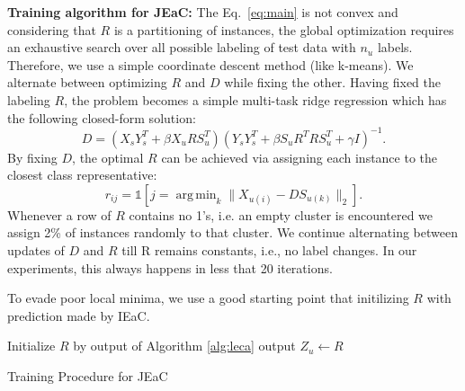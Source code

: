 \documentclass[letterpaper]{article}
\DeclareMathOperator*{\argmin}{arg\,min}
\begin{document}
\textbf{Training algorithm for JEaC: }
The Eq.~\eqref{eq:main} is not convex and considering that $R$ is a partitioning of instances, the global optimization requires an
exhaustive search over all possible labeling of test data with $n_u$ labels. Therefore, we use a simple coordinate descent
method (like k-means). We alternate between optimizing $R$ and $D$ while fixing the other.
Having fixed the labeling $R$, the problem becomes a simple multi-task ridge regression which has the following closed-form solution:
\begin{equation} \label{eq:d_update}
  D = (X_s Y_s^T + \beta X_u R S_u^T) (Y_s Y_s^T + \beta S_u R^T R S_u^T  + \gamma I)^{-1}.
\end{equation}
By fixing $D$, the optimal $R$ can be achieved via assigning each instance to the closest class representative:
\begin{equation} \label{eq:r_update}
  r_{ij} = \mathds{1}[j = \argmin_{k} \lVert X_{u(i)} - D S_{u(k)} \rVert_2 ].
\end{equation}
Whenever a row of $R$ contains no 1's, i.e.  an empty cluster is encountered we assign 2\% of instances randomly to that cluster.
We continue alternating between updates of $D$ and $R$ till R remains constants, i.e., no label changes. In our experiments, this always happens
in less that 20 iterations.

To evade poor local minima, we use a good starting point that initilizing $R$ with prediction made by IEaC.
\begin{algorithm}[t]
   \label{alg:jeac}
  {\small
  \BlankLine
  Initialize $R$ by output of Algorithm \ref{alg:leca} \;
  output $Z_u \leftarrow R$
 }
 \caption{Training Procedure for JEaC}
\end{algorithm}
%
%
\end{document}
